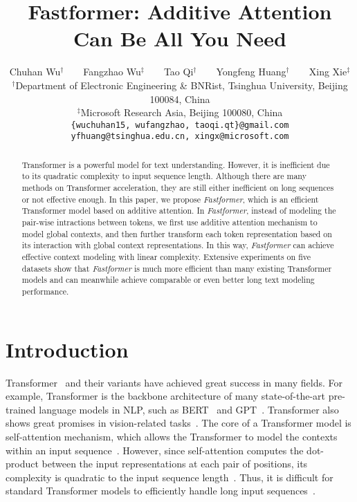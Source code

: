 \documentclass[11pt,a4paper]{article}
\title{Fastformer: Additive Attention Can Be All You Need}
\author{Chuhan Wu$^\dagger$~~~~Fangzhao Wu$^\ddagger$~~~~Tao Qi$^\dagger$~~~~Yongfeng Huang$^\dagger$~~~~Xing Xie$^\ddagger$\\
    $^\dagger$Department of Electronic Engineering \& BNRist, Tsinghua University, Beijing 100084, China  \\
     $^\ddagger$Microsoft Research Asia, Beijing 100080, China\\
  {\tt\{wuchuhan15, wufangzhao, taoqi.qt\}@gmail.com} \\ {\tt yfhuang@tsinghua.edu.cn, xingx@microsoft.com}
  }
\date{}
\begin{document}
\maketitle

\begin{abstract}

Transformer is a powerful model for text understanding.
However, it is inefficient due to its quadratic complexity to input sequence length.
Although there are many methods on Transformer acceleration, they are still either  inefficient on long sequences or not effective enough.
In this paper, we propose \textit{Fastformer}, which is an efficient Transformer model based on additive attention.
In \textit{Fastformer}, instead of modeling the pair-wise intractions between tokens, we first use additive attention mechanism to model global contexts, and then further transform each token representation based on its interaction with  global context representations.
In this way, \textit{Fastformer} can achieve effective context modeling with linear complexity.
Extensive experiments on five datasets show that \textit{Fastformer} is much more efficient than many existing Transformer models and can meanwhile achieve comparable or even better long text modeling performance.




\end{abstract}

\section{Introduction}

Transformer~\cite{vaswani2017attention} and their variants have achieved great success in many fields. For example, Transformer is the backbone architecture of many state-of-the-art pre-trained language models in NLP, such as BERT~\cite{devlin2019bert} and GPT~\cite{radford2019language}.
Transformer also shows great promises in vision-related tasks~\cite{dosovitskiy2020image}.
The core of a Transformer model is self-attention mechanism, which allows the Transformer to model the contexts within an input sequence~\cite{parikh2016decomposable}.
However, since self-attention computes the dot-product between the input representations at each pair of positions, its complexity is quadratic to the input sequence length~\cite{vaswani2017attention}.
Thus, it is difficult for standard Transformer models to efficiently handle long input sequences~\cite{tay2020efficient}.
\end{document}
